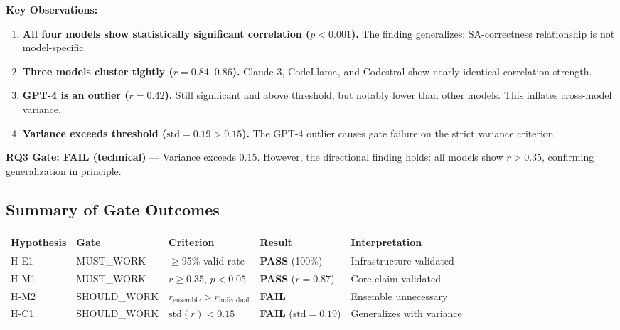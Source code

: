 \textbf{Key Observations:}

\begin{enumerate}
\item \textbf{All four models show statistically significant correlation ($p<0.001$).} The finding generalizes: SA-correctness relationship is not model-specific.

\item \textbf{Three models cluster tightly ($r=0.84$--$0.86$).} Claude-3, CodeLlama, and Codestral show nearly identical correlation strength.

\item \textbf{GPT-4 is an outlier ($r=0.42$).} Still significant and above threshold, but notably lower than other models. This inflates cross-model variance.

\item \textbf{Variance exceeds threshold ($\text{std}=0.19 > 0.15$).} The GPT-4 outlier causes gate failure on the strict variance criterion.
\end{enumerate}

\textbf{RQ3 Gate: FAIL (technical)} --- Variance exceeds 0.15. However, the directional finding holds: all models show $r>0.35$, confirming generalization in principle.

\subsection{Summary of Gate Outcomes}

\begin{table}[h]
\centering
\begin{tabular}{@{}lllll@{}}
\toprule
Hypothesis & Gate & Criterion & Result & Interpretation \\
\midrule
H-E1 & MUST\_WORK & $\geq$95\% valid rate & \textbf{PASS} (100\%) & Infrastructure validated \\
H-M1 & MUST\_WORK & $r\geq0.35$, $p<0.05$ & \textbf{PASS} ($r=0.87$) & Core claim validated \\
H-M2 & SHOULD\_WORK & $r_{\text{ensemble}} > r_{\text{individual}}$ & \textbf{FAIL} & Ensemble unnecessary \\
H-C1 & SHOULD\_WORK & $\text{std}(r) < 0.15$ & \textbf{FAIL} ($\text{std}=0.19$) & Generalizes with variance \\
\bottomrule
\end{tabular}
\end{table}
